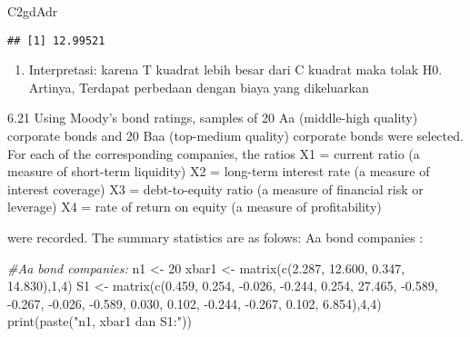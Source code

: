 \documentclass[
]{article}
\newenvironment{Shaded}{\begin{snugshade}}{\end{snugshade}}
\newcommand{\CommentTok}[1]{\textcolor[rgb]{0.56,0.35,0.01}{\textit{#1}}}
\newcommand{\DecValTok}[1]{\textcolor[rgb]{0.00,0.00,0.81}{#1}}
\newcommand{\FloatTok}[1]{\textcolor[rgb]{0.00,0.00,0.81}{#1}}
\newcommand{\FunctionTok}[1]{\textcolor[rgb]{0.00,0.00,0.00}{#1}}
\newcommand{\NormalTok}[1]{#1}
\newcommand{\OtherTok}[1]{\textcolor[rgb]{0.56,0.35,0.01}{#1}}
\newcommand{\SpecialCharTok}[1]{\textcolor[rgb]{0.00,0.00,0.00}{#1}}
\newcommand{\StringTok}[1]{\textcolor[rgb]{0.31,0.60,0.02}{#1}}
\providecommand{\tightlist}{%
  \setlength{\itemsep}{0pt}\setlength{\parskip}{0pt}}
\begin{document}
\begin{Shaded}
\begin{Highlighting}[]
\NormalTok{C2gdAdr}
\end{Highlighting}
\end{Shaded}

\begin{verbatim}
## [1] 12.99521
\end{verbatim}

\begin{enumerate}
\def\labelenumi{\alph{enumi}.}
\setcounter{enumi}{3}
\tightlist
\item
  Interpretasi: karena T kuadrat lebih besar dari C kuadrat maka tolak
  H0. Artinya, Terdapat perbedaan dengan biaya yang dikeluarkan
\end{enumerate}

6.21 Using Moody's bond ratings, samples of 20 Aa (middle-high quality)
corporate bonds and 20 Baa (top-medium quality) corporate bonds were
selected. For each of the corresponding companies, the ratios X1 =
current ratio (a measure of short-term liquidity) X2 = long-term
interest rate (a measure of interest coverage) X3 = debt-to-equity ratio
(a measure of financial risk or leverage) X4 = rate of return on equity
(a measure of profitability)

were recorded. The summary statistics are as folows: Aa bond companies :

\begin{Shaded}
\begin{Highlighting}[]
\CommentTok{\#Aa bond companies:}
\NormalTok{n1 }\OtherTok{\textless{}{-}} \DecValTok{20}
\NormalTok{xbar1 }\OtherTok{\textless{}{-}} \FunctionTok{matrix}\NormalTok{(}\FunctionTok{c}\NormalTok{(}\FloatTok{2.287}\NormalTok{, }\FloatTok{12.600}\NormalTok{, }\FloatTok{0.347}\NormalTok{, }\FloatTok{14.830}\NormalTok{),}\DecValTok{1}\NormalTok{,}\DecValTok{4}\NormalTok{)}
\NormalTok{S1 }\OtherTok{\textless{}{-}} \FunctionTok{matrix}\NormalTok{(}\FunctionTok{c}\NormalTok{(}\FloatTok{0.459}\NormalTok{, }\FloatTok{0.254}\NormalTok{, }\SpecialCharTok{{-}}\FloatTok{0.026}\NormalTok{, }\SpecialCharTok{{-}}\FloatTok{0.244}\NormalTok{, }\FloatTok{0.254}\NormalTok{, }\FloatTok{27.465}\NormalTok{, }\SpecialCharTok{{-}}\FloatTok{0.589}\NormalTok{, }\SpecialCharTok{{-}}\FloatTok{0.267}\NormalTok{, }\SpecialCharTok{{-}}\FloatTok{0.026}\NormalTok{, }\SpecialCharTok{{-}}\FloatTok{0.589}\NormalTok{, }\FloatTok{0.030}\NormalTok{, }\FloatTok{0.102}\NormalTok{, }\SpecialCharTok{{-}}\FloatTok{0.244}\NormalTok{, }\SpecialCharTok{{-}}\FloatTok{0.267}\NormalTok{, }\FloatTok{0.102}\NormalTok{, }\FloatTok{6.854}\NormalTok{),}\DecValTok{4}\NormalTok{,}\DecValTok{4}\NormalTok{)}
\FunctionTok{print}\NormalTok{(}\FunctionTok{paste}\NormalTok{(}\StringTok{"n1, xbar1 dan S1:"}\NormalTok{))}
\end{Highlighting}
\end{Shaded}
\end{document}
